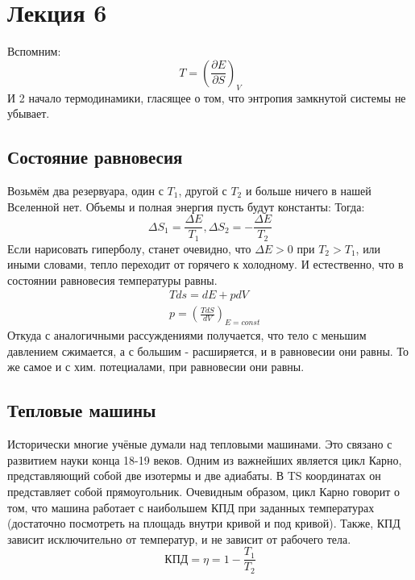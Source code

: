 \documentclass[a4paper, 12pt]{article}
\begin{document}
	\section{Лекция 6}
	Вспомним:
	\begin{equation*}
		T = (\frac{\partial E}{\partial S})_{V}
	\end{equation*}
	И 2 начало термодинамики, гласящее о том, что энтропия замкнутой системы не убывает.
	\subsection{Состояние равновесия}
	Возьмём два резервуара, один с $T_{1}$, другой с $T_{2}$ и больше ничего в нашей Вселенной нет. Объемы и полная энергия пусть будут константы: Тогда:
	\begin{equation*}
		\Delta S_{1} = \frac{\Delta E}{T_{1}}, \Delta S_{2} = - \frac{\Delta E}{T_{2}}
	\end{equation*}
	Если нарисовать гиперболу, станет очевидно, что $\Delta E > 0$ при $T_{2} > T_{1}$, или иными словами, тепло переходит от горячего к холодному. И естественно, что в состоянии равновесия температуры равны. 
	\begin{equation*}
		\begin{aligned}
			& Tds = dE+pdV                     \\
			& p =(\frac {TdS}{dV})_{E = const} 
		\end{aligned}
	\end{equation*}
	Откуда с аналогичными рассуждениями получается, что тело с меньшим давлением сжимается, а с большим - расширяется, и в равновесии они равны. То же самое и с хим. потециалами, при равновесии они равны. 
	\subsection{Тепловые машины}
	Исторически многие учёные думали над тепловыми машинами. Это связано с развитием науки конца 18-19 веков. Одним из важнейших является цикл Карно, представляющий собой две изотермы и две адиабаты. В TS координатах он представляет собой прямоугольник. Очевидным образом, цикл Карно говорит о том, что машина работает с наибольшем КПД при заданных температурах (достаточно посмотреть на площадь внутри кривой и под кривой). Также, КПД зависит исключительно от температур, и не зависит от рабочего тела. 
	\begin{equation*}
		\text{КПД}=\eta=1 - \frac{T_{1}}{T_{2}}
	\end{equation*}
	
\end{document}
